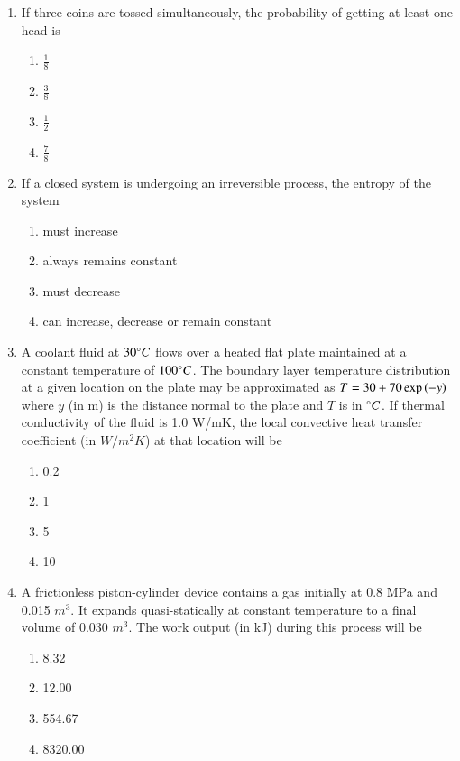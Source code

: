 \documentclass[journal]{IEEEtran}
\begin{document}
\begin{enumerate}
    \item If three coins are tossed simultaneously, the probability of getting at
    least one head is
    \begin{multicols}{4}
    \begin{enumerate}
        \item $\frac{1}{8}$
        \item $\frac{3}{8}$
        \item $\frac{1}{2}$
        \item $\frac{7}{8}$
    \end{enumerate}
    \end{multicols}

    \item If a closed system is undergoing an irreversible process, the entropy
    of the system
    \begin{enumerate}
        \item must increase
        \item always remains constant
        \item must decrease
        \item can increase, decrease or remain constant
    \end{enumerate}

    \item A coolant fluid at $30 \degree C$ flows over a heated flat plate
    maintained at a constant temperature of $100 \degree C$. The boundary
    layer temperature distribution at a given location on the plate may be
    approximated as $T = 30 + 70\exp\left(-y\right)$ where $y$ (in m) is the
    distance normal to the plate and $T$ is in $\degree C$. If thermal
    conductivity of the fluid is 1.0 W/mK, the local convective heat
    transfer coefficient (in $W/m^2K$) at that location will be
    \begin{multicols}{4}
    \begin{enumerate}
        \item 0.2
        \item 1
        \item 5
        \item 10
    \end{enumerate}
    \end{multicols}

    \item A frictionless piston-cylinder device contains a gas initially at
    0.8 MPa and 0.015 $m^3$. It expands quasi-statically at constant
    temperature to a final volume of 0.030 $m^3$. The work output (in kJ)
    during this process will be
    \begin{multicols}{4}
    \begin{enumerate}
        \item 8.32
        \item 12.00
        \item 554.67
        \item 8320.00
    \end{enumerate}
    \end{multicols}


\end{enumerate}
\end{document}
